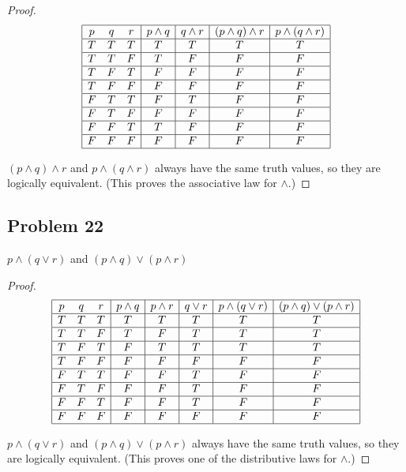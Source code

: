 \documentclass[14pt]{extarticle}
\begin{document}
\begin{proof}
$$
\begin{array}{|ccc|c|c|c|c|}
\hline
p & q & r & p \wedge q & q \wedge r & (p \wedge q) \wedge r &
p \wedge (q \wedge r) \\
\hline
T & T & T & T & T & T & T \\
\hline
T & T & F & T & F & F & F \\
\hline
T & F & T & F & F & F & F \\
\hline
T & F & F & F & F & F & F \\
\hline
F & T & T & F & T & F & F \\
\hline
F & T & F & F & F & F & F \\
\hline
F & F & T & T & F & F & F \\
\hline
F & F & F & F & F & F & F \\
\hline
\end{array}
$$

$(p \wedge q) \wedge r$ and $p \wedge (q \wedge r)$ always have the same truth values, so they are logically equivalent. (This proves the associative law for $\wedge$.)
\end{proof}

\subsection{Problem 22}
$p \wedge (q \vee r)$ and $(p \wedge q) \vee (p \wedge r)$

\begin{proof}
$$
\begin{array}{|ccc|c|c|c|c|c|}
\hline
p & q & r & p \wedge q & p \wedge r & q \vee r & p \wedge (q \vee r) &
(p \wedge q) \vee (p \wedge r) \\
\hline
T & T & T & T & T & T & T & T \\
\hline
T & T & F & T & F & T & T & T \\
\hline
T & F & T & F & T & T & T & T \\
\hline
T & F & F & F & F & F & F & F \\
\hline
F & T & T & F & F & T & F & F \\
\hline
F & T & F & F & F & T & F & F \\
\hline
F & F & T & F & F & T & F & F \\
\hline
F & F & F & F & F & F & F & F \\
\hline
\end{array}
$$

$p \wedge (q \vee r)$ and $(p \wedge q) \vee (p \wedge r)$ always have the same truth values, so they are logically equivalent. (This proves one of the distributive laws for $\wedge$.)
\end{proof}
\end{document}
